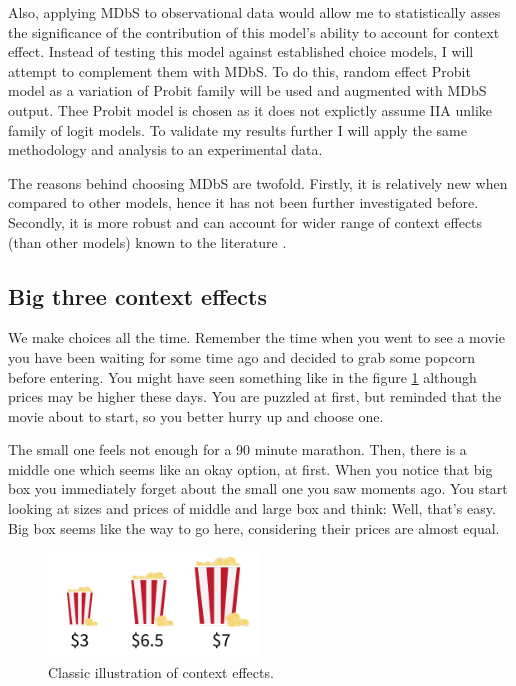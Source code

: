 \documentclass[a4paper,12pt]{article}
\begin{document}
Also, applying MDbS to observational data would allow me to statistically asses the significance of the contribution of this model's ability to account for context effect. Instead of testing this model against established choice models, I will attempt to complement them with MDbS. To do this, random effect Probit model as a variation of Probit family will be used and augmented with MDbS output. Thee Probit model is chosen as it does not explictly assume IIA unlike family of logit models. To validate my results further I will apply the same methodology and analysis to an experimental data.

The reasons behind choosing MDbS are twofold. Firstly, it is relatively new when compared to other models, hence it has not been further investigated before. Secondly, it is more robust and can account for wider range of context effects (than other models) known to the literature \citep{noguchi2018multialternative}.


\subsection{Big three context effects}

We make choices all the time. Remember the time when you went to see a movie you have been waiting for some time ago and decided to grab some popcorn before entering. You might have seen something like in the figure \ref{fig:decoyPopcornExample}  although prices may be higher these days. You are puzzled at first, but reminded that the movie about to start, so you better hurry up and choose one. 

The small one feels not enough for a 90 minute marathon. Then, there is a middle one which seems like an okay option,  at first. When you notice that big box you immediately forget about the small one you saw moments ago. You start looking at sizes and prices of middle and large box and think: Well, that's easy. Big box seems like the way to go here, considering their prices are almost equal. 


\begin{figure}[H]
    \centering
    \includegraphics[width=0.5\textwidth]{staticFiles/popcornDecoy.png}
    \caption{Classic illustration of context effects.}
    \label{fig:decoyPopcornExample}
\end{figure}
\end{document}
